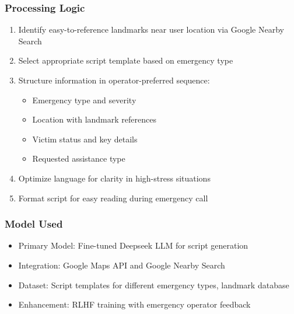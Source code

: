 \subsubsection{Processing Logic}
\begin{enumerate}
    \item Identify easy-to-reference landmarks near user location via Google Nearby Search
    \item Select appropriate script template based on emergency type
    \item Structure information in operator-preferred sequence:
    \begin{itemize}
        \item Emergency type and severity
        \item Location with landmark references
        \item Victim status and key details
        \item Requested assistance type
    \end{itemize}
    \item Optimize language for clarity in high-stress situations
    \item Format script for easy reading during emergency call
\end{enumerate}

\subsubsection{Model Used}
\begin{itemize}
    \item Primary Model: Fine-tuned Deepseek LLM for script generation
    \item Integration: Google Maps API and Google Nearby Search
    \item Dataset: Script templates for different emergency types, landmark database
    \item Enhancement: RLHF training with emergency operator feedback
\end{itemize}